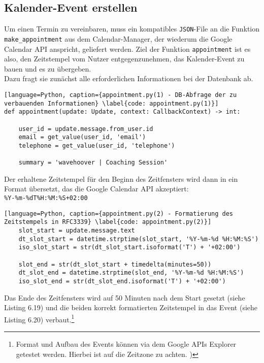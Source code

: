         \subsection{Kalender-Event erstellen} \label{Implementierung: appointment.py}
            Um einen Termin zu vereinbaren, muss ein kompatibles \verb|JSON|-File an die Funktion \verb|make_appointment| aus dem Calendar-Manager, der wiederum die Google Calendar API anspricht, geliefert werden. Ziel der Funktion \verb|appointment| ist es also, den Zeitstempel vom Nutzer entgegenzunehmen, das Kalender-Event zu bauen und es zu übergeben. \\
            Dazu fragt sie zunächst alle erforderlichen Informationen bei der Datenbank ab. 

            \begin{lstlisting}[language=Python, caption={appointment.py(1) - DB-Abfrage der zu verbauenden Informationen} \label{code: appointment.py(1)}]
def appointment(update: Update, context: CallbackContext) -> int:

    user_id = update.message.from_user.id
    email = get_value(user_id, 'email')
    telephone = get_value(user_id, 'telephone')
    
    summary = 'wavehoover | Coaching Session'
            \end{lstlisting}
            
            Der erhaltene Zeitstempel für den Beginn des Zeitfensters wird dann in ein Format übersetzt, das die Google Calendar API akzeptiert: \\ 
            \verb/%Y-%m-%dT%H:%M:%S+02:00/ \\

            \begin{lstlisting}[language=Python, caption={appointment.py(2) - Formatierung des Zeitstempels in RFC3339} \label{code: appointment.py(2)}]
    slot_start = update.message.text
    dt_slot_start = datetime.strptime(slot_start, '%Y-%m-%d %H:%M:%S')
    iso_slot_start = str(dt_slot_start.isoformat('T') + '+02:00')

    slot_end = str(dt_slot_start + timedelta(minutes=50))
    dt_slot_end = datetime.strptime(slot_end, '%Y-%m-%d %H:%M:%S')
    iso_slot_end = str(dt_slot_end.isoformat('T') + '+02:00')
            \end{lstlisting}

            Das Ende des Zeitfensters wird auf 50 Minuten nach dem Start gesetzt (siehe Listing 6.19) und die beiden korrekt formatierten Zeitstempel in das Event (siehe Listing 6.20) verbaut.\footnote{Format und Aufbau des Events können via dem Google APIs Explorer getestet werden. Hierbei ist auf die Zeitzone zu achten. \cite{apiExplorer})}

